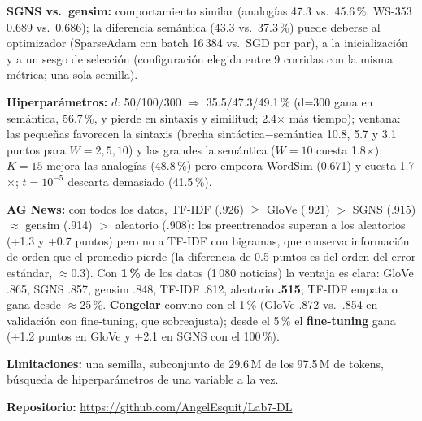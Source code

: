 \documentclass[10pt,a4paper]{article}
\newcommand{\repourl}{\url{https://github.com/AngelEsquit/Lab7-DL}}
\begin{document}
\par\smallskip\textbf{SGNS vs.\ gensim:} comportamiento similar (analogías 47.3 vs.\ 45.6\,\%, WS-353 0.689 vs.\ 0.686); la diferencia semántica (43.3 vs.\ 37.3\,\%) puede deberse al optimizador (SparseAdam con batch 16\,384 vs.\ SGD por par), a la inicialización y a un sesgo de selección (configuración elegida entre 9 corridas con la misma métrica; una sola semilla). \par\smallskip\textbf{Hiperparámetros:} $d$: 50/100/300 $\Rightarrow$ 35.5/47.3/49.1\,\% (d=300 gana en semántica, 56.7\,\%, y pierde en sintaxis y similitud; 2.4$\times$ más tiempo); ventana: las pequeñas favorecen la sintaxis (brecha sintáctica$-$semántica 10.8, 5.7 y 3.1 puntos para $W{=}2,5,10$) y las grandes la semántica ($W{=}10$ cuesta 1.8$\times$); $K{=}15$ mejora las analogías (48.8\,\%) pero empeora WordSim (0.671) y cuesta 1.7$\times$; $t{=}10^{-5}$ descarta demasiado (41.5\,\%). \par\smallskip\textbf{AG News:} con todos los datos, TF-IDF (.926) $\ge$ GloVe (.921) $>$ SGNS (.915) $\approx$ gensim (.914) $>$ aleatorio (.908): los preentrenados superan a los aleatorios (+1.3 y +0.7 puntos) pero no a TF-IDF con bigramas, que conserva información de orden que el promedio pierde (la diferencia de 0.5 puntos es del orden del error estándar, $\approx$0.3). Con \textbf{1\,\%} de los datos (1\,080 noticias) la ventaja es clara: GloVe .865, SGNS .857, gensim .848, TF-IDF .812, aleatorio \textbf{.515}; TF-IDF empata o gana desde $\approx$25\,\%. \textbf{Congelar} convino con el 1\,\% (GloVe .872 vs.\ .854 en validación con fine-tuning, que sobreajusta); desde el 5\,\% el \textbf{fine-tuning} gana (+1.2 puntos en GloVe y +2.1 en SGNS con el 100\,\%). \par\smallskip\textbf{Limitaciones:} una semilla, subconjunto de 29.6\,M de los 97.5\,M de tokens, búsqueda de hiperparámetros de una variable a la vez.

\vspace{3pt}\textbf{Repositorio:} \repourl
\end{document}

